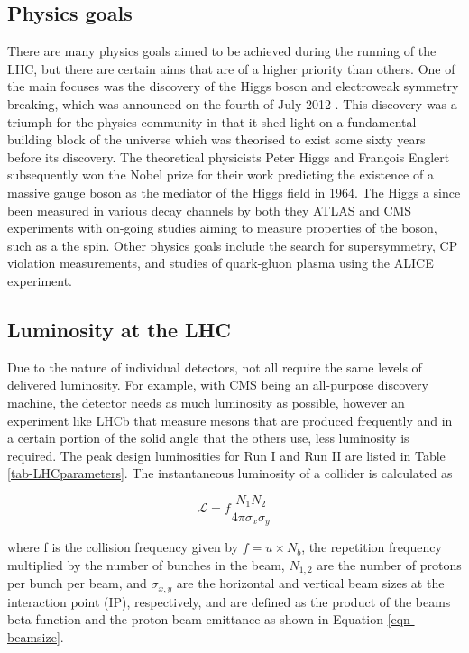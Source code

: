 \subsection{Physics goals}

 There are many physics goals aimed to be achieved during the running of the LHC, but there are certain aims that are of a higher priority than others. One of the main focuses was the discovery of the Higgs boson and electroweak symmetry breaking, which was announced on the fourth of July 2012 \cite{CMSHiggs, ATLASHiggs}. This discovery was a triumph for the physics community in that it shed light on a fundamental building block of the universe which was theorised to exist some sixty years before its discovery. The theoretical physicists Peter Higgs and Fran\c{c}ois Englert subsequently won the Nobel prize for their work predicting the existence of a massive gauge boson as the mediator of the Higgs field in 1964. The Higgs a since been measured in various decay channels by both they ATLAS and CMS experiments with on-going studies aiming to measure properties of the boson, such as a the spin. Other physics goals include the search for supersymmetry, CP violation measurements, and studies of quark-gluon plasma using the ALICE experiment.  

\subsection{Luminosity at the LHC}

Due to the nature of individual detectors, not all require the same levels of delivered luminosity. For example, with CMS being an all-purpose discovery machine, the detector needs as much luminosity as possible, however an experiment like LHCb that measure mesons that are produced frequently and in a certain portion of the solid angle that the others use, less luminosity is required. The peak design luminosities for Run I and Run II are listed in Table \ref{tab-LHCparameters}. The instantaneous luminosity of a collider is calculated as

\begin{equation}
\mathcal{L}=f\frac{N_1N_2}{4\pi\sigma_x\sigma_y}
\end{equation}

where f is the collision frequency given by $f=u\times N_b$, the repetition frequency multiplied by the number of bunches in the beam, $N_{1,2}$ are the number of protons per bunch per beam, and $\sigma_{x,y}$ are the horizontal and vertical beam sizes at the interaction point (IP), respectively, and are defined as the product of the beams beta function and the proton beam emittance as shown in Equation \ref{eqn-beamsize}.

